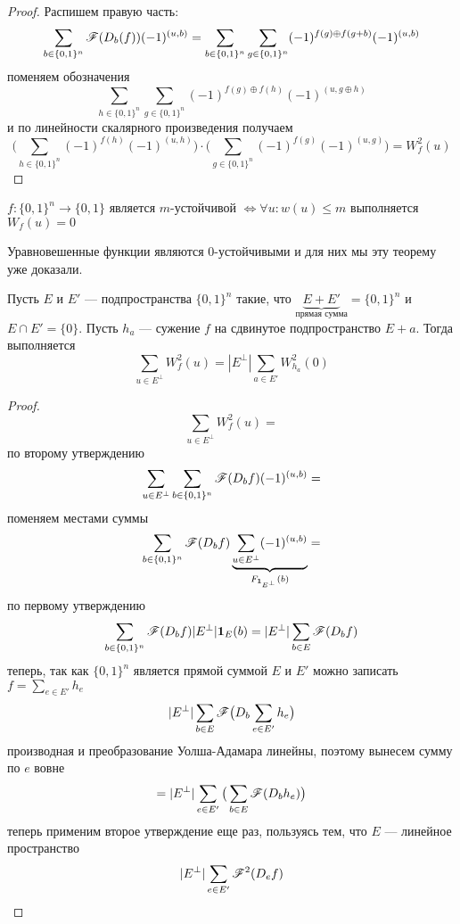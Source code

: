 \begin{proof}
Распишем правую часть:
$$\sum\limits_{b \in \{0,1\}^n} \mathscr{F}(D_b(f)) (-1)^{(u,b)} = 
\sum\limits_{b \in \{0,1\}^n} \sum\limits_{g \in \{0,1\}^n} (-1)^{f(g) \oplus f(g + b)} (-1)^{(u,b)}$$
поменяем обозначения
$$\sum\limits_{h \in \{0,1\}^n} \sum\limits_{g \in \{0,1\}^n} (-1)^{f(g) \oplus f(h)} (-1)^{(u,g \oplus h)}$$
и по линейности скалярного произведения получаем
$$\bigg(\sum\limits_{h \in \{0,1\}^n}  (-1)^{f(h)} (-1)^{(u, h)}\bigg) \cdot
   \bigg(\sum\limits_{g \in \{0,1\}^n}  (-1)^{f(g)} (-1)^{(u, g)}\bigg) = W_f^2(u)$$
\end{proof}




\begin{theorem}
$f: \{0,1\}^n \to \{0,1\}$ является $m$-устойчивой $\iff \forall u \colon w(u) \le m$ выполняется $W_f(u) = 0$
\end{theorem}

Уравновешенные функции являются 0-устойчивыми и для них мы эту теорему уже доказали.

\begin{lemma}
Пусть $E$ и $E'$ --- подпространства $\{0,1\}^n$ такие, что $\underbrace{E + E'}_{\text{прямая сумма}}
 = \{0,1\}^n$ и $E \cap E' = \{0\}$.
Пусть $h_a$ --- сужение $f$ на сдвинутое подпространство $E + a$. Тогда выполняется
$$\sum\limits_{u \in E^{\bot}} W_f^2 (u) = |E^{\bot}| \sum\limits_{a \in E'} W_{h_a}^2 (0)$$
\end{lemma}

\begin{proof}
$$\sum\limits_{u \in E^{\bot}} W_f^2(u) = $$
по второму утверждению
$$\sum\limits_{u \in E^{\bot}} \sum\limits_{b \in \{0,1\}^n} \mathscr{F}(D_b f) (-1)^{(u,b)} = $$
поменяем местами суммы
$$ \sum\limits_{b \in \{0,1\}^n} \mathscr{F}(D_b f) \underbrace{\sum\limits_{u \in E^{\bot}} (-1)^{(u,b)}}_
{F_{\mathbf{1}_{E^{\bot}}} (b)} = $$
по первому утверждению
$$  \sum\limits_{b \in \{0,1\}^n} \mathscr{F}(D_b f) |E^{\bot}| \mathbf{1}_E (b) = |E^{\bot}| \sum\limits_{b \in E} \mathscr{F}(D_b f)$$
теперь, так как $\{0,1\}^n$ является прямой суммой $E$ и $E'$ можно записать $f = \sum\limits_{e \in E'} h_e$
$$|E^{\bot}| \sum\limits_{b \in E} \mathscr{F}\big( D_b \sum\limits_{e \in E'} h_e\big)$$
производная и преобразование Уолша-Адамара линейны, поэтому вынесем сумму по $e$ вовне
$$= |E^{\bot}| \sum\limits_{e \in E'} \big(\sum\limits_{b \in E} \mathscr{F}(D_b h_e)\big)$$
теперь применим второе утверждение еще раз, пользуясь тем, что $E$ --- линейное пространство
$$|E^{\bot}| \sum\limits_{e \in E'} \mathscr{F}^2(D_e f)$$
\end{proof}

